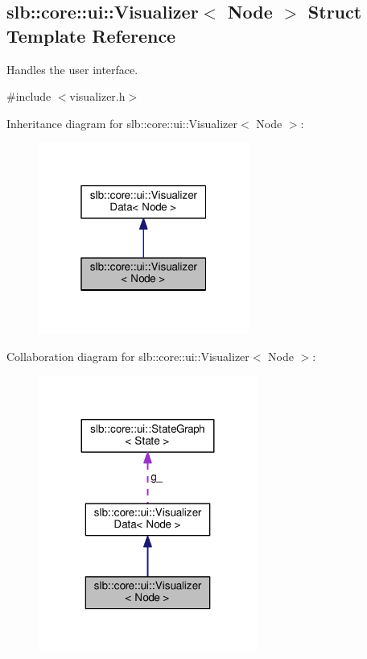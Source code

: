 \hypertarget{structslb_1_1core_1_1ui_1_1Visualizer}{}\subsection{slb\+:\+:core\+:\+:ui\+:\+:Visualizer$<$ Node $>$ Struct Template Reference}
\label{structslb_1_1core_1_1ui_1_1Visualizer}


Handles the user interface.  




{\ttfamily \#include $<$visualizer.\+h$>$}



Inheritance diagram for slb\+:\+:core\+:\+:ui\+:\+:Visualizer$<$ Node $>$\+:\nopagebreak
\begin{figure}[H]
\begin{center}
\leavevmode
\includegraphics[width=196pt]{structslb_1_1core_1_1ui_1_1Visualizer__inherit__graph}
\end{center}
\end{figure}


Collaboration diagram for slb\+:\+:core\+:\+:ui\+:\+:Visualizer$<$ Node $>$\+:\nopagebreak
\begin{figure}[H]
\begin{center}
\leavevmode
\includegraphics[width=203pt]{structslb_1_1core_1_1ui_1_1Visualizer__coll__graph}
\end{center}
\end{figure}
